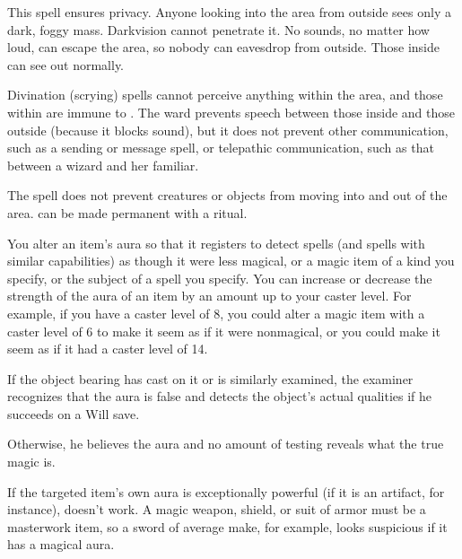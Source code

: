 \spelldur{\durext \dismissable}
\spelleffect This spell ensures privacy. Anyone looking into the area from outside sees only a dark, foggy mass. Darkvision cannot penetrate it. No sounds, no matter how loud, can escape the area, so nobody can eavesdrop from outside. Those inside can see out normally.

Divination (scrying) spells cannot perceive anything within the area, and those within are immune to . The ward prevents speech between those inside and those outside (because it blocks sound), but it does not prevent other communication, such as a sending or message spell, or telepathic communication, such as that between a wizard and her familiar.
\par The spell does not prevent creatures or objects from moving into and out of the area.
\spellnotes {} can be made permanent with a  ritual.

\spelleffect You alter an item's aura so that it registers  to  detect spells (and spells with similar  capabilities) as though it were less magical, or a magic item of a kind you specify, or the subject of a spell you specify. You can increase or decrease the strength of the aura of an item by an amount up to your caster level. For example, if you have a caster level of 8, you could alter a magic item with a caster level of 6 to make it seem as if it were nonmagical, or you could make it seem as if it had a caster level of 14.
\par If the object bearing   has  cast on it or is similarly examined, the examiner recognizes that the aura is false and detects the object's actual qualities if he succeeds on a Will save.
\par Otherwise, he believes the aura and no  amount of testing reveals what the true  magic is.
\par If the targeted item's own aura is exceptionally powerful (if it is an artifact, for  instance),  doesn't work.
 A magic weapon, shield, or suit of  armor must be a masterwork item, so a  sword of average make, for example, looks  suspicious if it has a magical aura.


